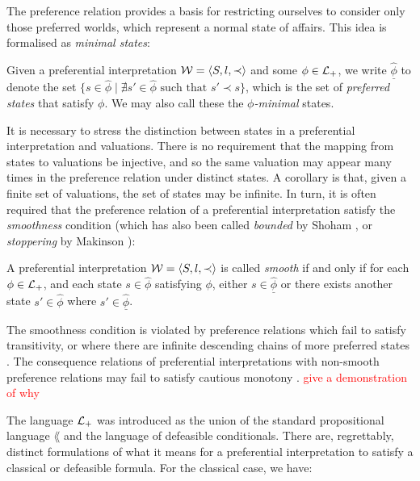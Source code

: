 The preference relation provides a basis for restricting ourselves to consider only those preferred worlds, which represent
a normal state of affairs. This idea is formalised as \textit{minimal states}:

\begin{definition}
	\label{definition:state-minimal}

	Given a preferential interpretation $\mathcal{W} = \langle S,l,\prec \rangle$ and some $\phi \in \mathcal{L}_+$, we write $\underline{\hat{\phi}}$ to denote the set
	$\{s \in \hat{\phi}\mid \nexists s' \in \hat{\phi}\text{ such that }s' \prec s \}$, which is the set of \textit{preferred
	states} that satisfy $\phi$. We may also call these the \textit{$\phi$-minimal} states.
\end{definition}

It is necessary to stress the distinction between states in a preferential interpretation and valuations. There is no requirement
that the mapping from states to valuations be injective, and so the same valuation may appear many times in the
preference relation under distinct states. A corollary is that, given a finite set of valuations, the set of states may be
infinite. In turn, it is often required that the preference relation of a preferential interpretation satisfy the \textit{smoothness}
condition (which has also been called \textit{bounded} by Shoham \cite{shohamSemanticApproach}, or \textit{stoppering}
by Makinson \cite{makinson2003bridges}):

\begin{definition}
	\label{definition:smoothness} 

	A preferential interpretation $\mathcal{W} = \langle S,l,\prec \rangle$ is called \textit{smooth} if and only if for each $\phi \in \mathcal{L}_+$, and each
	state $s \in \hat{\phi}$ satisfying $\phi$, either $s \in \underline{\hat{\phi}}$ or there exists another state $s' \in
	\hat{\phi}$ where $s' \in \underline{\hat{\phi}}$.
\end{definition}

The smoothness condition is violated by preference relations which fail to satisfy transitivity, or where there are infinite
descending chains of more preferred states \cite{Schlechta1996}. The consequence relations of preferential
interpretations with non-smooth preference relations may fail to satisfy cautious monotony
\cite{kraus1990nonmonotonic,makinson2003bridges}. \textcolor{red}{give a demonstration of why}

The language $\mathcal{L}_+$ was introduced as the union of the standard propositional language $\lang$ and the language of defeasible
conditionals. There are, regrettably, distinct formulations of what it means for a preferential interpretation to
satisfy a classical or defeasible formula. For the classical case, we have:

